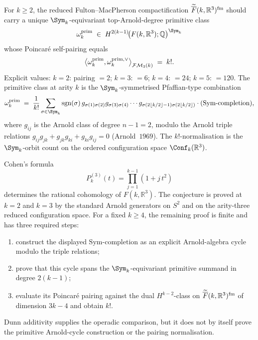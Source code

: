 \begin{conjecture}
\label{thm:cycat-arity-k-primitive-class}
\ClaimStatusConjectured
For $k \geq 2$, the reduced Fulton--MacPherson compactification
$\widetilde{\overline{F}}(k, \mathbb{R}^3)^{\mathrm{fm}}$ should carry a
unique $\Sym_k$-equivariant top-Arnold-degree primitive class
\[
 \omega_k^{\mathrm{prim}}
 \;\in\;
 H^{2(k-1)}\!\bigl(F(k, \mathbb{R}^3); \mathbb{Q}\bigr)^{\Sym_k}
\]
whose Poincar\'e self-pairing equals
\[
 \bigl\langle \omega_k^{\mathrm{prim}}, \omega_k^{\mathrm{prim}, \vee}\bigr\rangle_{\mathcal{FM}_3(k)}
 \;=\; k!.
\]
Explicit values:
$k = 2$: pairing $= 2$; $k = 3$: $= 6$; $k = 4$: $= 24$;
$k = 5$: $= 120$. The primitive class at arity $k$ is the
$\Sym_k$-symmetrised Pfaffian-type combination
\[
 \omega_k^{\mathrm{prim}}
 \;=\;
 \frac{1}{k!}
 \sum_{\sigma \in \Sym_k}
 \mathrm{sgn}(\sigma) \,
 g_{\sigma(1)\sigma(2)} g_{\sigma(3)\sigma(4)}
 \cdots g_{\sigma(2\lfloor k/2 \rfloor - 1)\sigma(2\lfloor k/2 \rfloor)}
 \cdot (\mathrm{Sym\text{-}completion}),
\]
where $g_{ij}$ is the Arnold class of degree $n - 1 = 2$, modulo the
Arnold triple relations
$g_{ij} g_{jk} + g_{jk} g_{ki} + g_{ki} g_{ij} = 0$
(Arnold~$1969$). The $k!$-normalisation is the $\Sym_k$-orbit count on
the ordered configuration space $\Conf_k(\mathbb{R}^3)$.
\end{conjecture}

\begin{remark}
\label{rem:cycat-arity-k-proof-obligation}
Cohen's formula
\[
P_k^{(3)}(t)=\prod_{j=1}^{k-1}(1+j\,t^2)
\]
determines the rational cohomology of $F(k,\mathbb R^3)$. The conjecture
is proved at $k=2$ and $k=3$ by the standard Arnold generators on
$S^2$ and on the arity-three reduced configuration space. For a fixed
$k\ge4$, the remaining proof is finite and has three required steps:
\begin{enumerate}[label=\textup{(\roman*)}]
 \item construct the displayed $\mathrm{Sym\text{-}completion}$ as an
 explicit Arnold-algebra cycle modulo the triple relations;
 \item prove that this cycle spans the $\Sym_k$-equivariant primitive
 summand in degree $2(k-1)$;
 \item evaluate its Poincar\'e pairing against the dual
 $H^{k-2}$-class on
 $\widetilde{\overline{F}}(k,\mathbb R^3)^{\mathrm{fm}}$ of dimension
 $3k-4$ and obtain $k!$.
\end{enumerate}
Dunn additivity supplies the operadic comparison, but it does not by
itself prove the primitive Arnold-cycle construction or the pairing
normalisation.
\end{remark}

